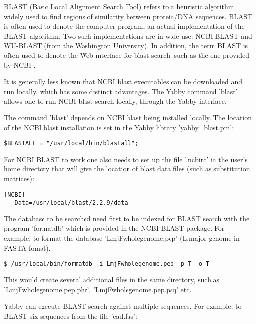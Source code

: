 BLAST (Basic Local Alignment Search Tool) refers to a heuristic
algorithm widely used to find regions of similarity between
protein/DNA sequences. BLAST is often used to denote the computer
program, an actual implementation of the BLAST algorithm. Two
such implementations are in wide use: NCBI BLAST and WU-BLAST
(from the Washington University). In addition, the term BLAST
is often used to denote the Web interface for blast search,
such as the one provided by NCBI \cite{wwwblast}.

It is generally less known that NCBI blast executables can be
downloaded \cite{ftpblast} and run locally, which has some
distinct advantages. The Yabby command 'blast' allows one to
run NCBI blast search locally, through the Yabby interface. 

The command 'blast' depends on NCBI blast being installed locally.
The location of the NCBI blast installation is set in the
Yabby library 'yabby\_blast.pm':

\begin{verbatim}
$BLASTALL = "/usr/local/bin/blastall";
\end{verbatim}

For NCBI BLAST to work one also needs to set up the file
'.ncbirc' in the user's home directory that will give the
location of blast data files (such as substitution matrices): 

\begin{verbatim}
[NCBI]
   Data=/usr/local/blast/2.2.9/data
\end{verbatim}

The database to be searched need first to be indexed for BLAST
search with the program 'formatdb' which is provided in the
NCBI BLAST package.  For example, to format the database
'LmjFwholegenome.pep' (L.major genome in FASTA fomat),

\begin{verbatim}
$ /usr/local/bin/formatdb -i LmjFwholegenome.pep -p T -o T
\end{verbatim}

This would create several additional files in the same directory,
such as 'LmjFwholegenome.pep.phr', 'LmjFwholegenome.pep.psq' etc.

Yabby can execute BLAST search against multiple sequences. For
example, to BLAST six sequences from the file 'cad.fas':


